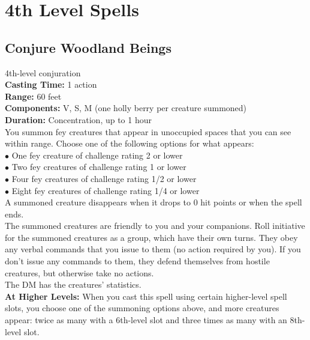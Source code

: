 \documentclass[11pt, A4paper, english]{article}
\begin{document}
	\section{4th Level Spells}
		\subsection{Conjure Woodland Beings}
4th-level conjuration \\
\textbf{Casting Time:} 1 action \\
\textbf{Range:} 60 feet \\
\textbf{Components:} V, S, M (one holly berry per creature summoned) \\
\textbf{Duration:} Concentration, up to 1 hour \\
You summon fey creatures that appear in unoccupied spaces that you can see within range. Choose one of the following options for what appears: \\
\indent $\bullet$ One fey creature of challenge rating 2 or lower \\
\indent $\bullet$ Two fey creatures of challenge rating 1 or lower \\
\indent $\bullet$ Four fey creatures of challenge rating 1/2 or lower \\
\indent $\bullet$ Eight fey creatures of challenge rating 1/4 or lower \\
A summoned creature disappears when it drops to 0 hit points or when the spell ends. \\
The summoned creatures are friendly to you and your companions. Roll initiative for the summoned creatures as a group, which have their own turns. They obey any verbal commands that you issue to them (no action required by you). If you don't issue any commands to them, they defend themselves from hostile creatures, but otherwise take no actions. \\
The DM has the creatures’ statistics. \\
\textbf{At Higher Levels:} When you cast this spell using certain higher-level spell slots, you choose one of the summoning options above, and more creatures appear: twice as many with a 6th-level slot and three times as many with an 8th-level slot.
\end{document}
